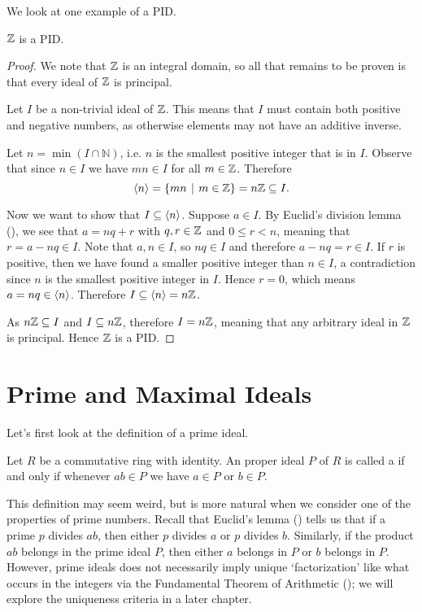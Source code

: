 We look at one example of a PID.
\begin{proposition}\label{prop-Z-is-PID}
    $\mathbb{Z}$ is a PID.
\end{proposition}
\begin{proof}
    We note that $\mathbb{Z}$ is an integral domain, so all that remains to be proven is that every ideal of $\mathbb{Z}$ is principal.

    Let $I$ be a non-trivial ideal of $\mathbb{Z}$. This means that $I$ must contain both positive and negative numbers, as otherwise elements may not have an additive inverse.

    Let $n = \min(I \cap \mathbb{N})$, i.e. $n$ is the smallest positive integer that is in $I$. Observe that since $n \in I$ we have $mn \in I$ for all $m \in \mathbb{Z}$. Therefore
    \[
        \princ{n} = \{mn \vert m \in \Z\} = n\Z \subseteq I.
    \]

    Now we want to show that $I \subseteq \left\langle n\right\rangle$. Suppose $a \in I$. By Euclid's division lemma (), we see that $a = nq + r$ with $q, r \in \mathbb{Z}$ and $0 \leq r < n$, meaning that $r = a - nq \in I$. Note that $a, n \in I$, so $nq \in I$ and therefore $a - nq = r \in I$. If $r$ is positive, then we have found a smaller positive integer than $n \in I$, a contradiction since $n$ is the smallest positive integer in $I$. Hence $r = 0$, which means $a = nq \in \left\langle n\right\rangle$. Therefore $I \subseteq \left\langle n\right\rangle = n\mathbb{Z}$.

    As $n\mathbb{Z} \subseteq I$ and $I \subseteq n\mathbb{Z}$, therefore $I = n\mathbb{Z}$, meaning that any arbitrary ideal in $\mathbb{Z}$ is principal. Hence $\mathbb{Z}$ is a PID.
\end{proof}

\section{Prime and Maximal Ideals}\label{section-prime-and-maximal-ideals}
Let's first look at the definition of a prime ideal.

\begin{definition}
    Let $R$ be a commutative ring with identity. An proper ideal $P$ of $R$ is called a  if and only if whenever $ab \in P$ we have $a \in P$ or $b \in P$.
\end{definition}

This definition may seem weird, but is more natural when we consider one of the properties of prime numbers. Recall that Euclid's lemma () tells us that if a prime $p$ divides $ab$, then either $p$ divides $a$ or $p$ divides $b$. Similarly, if the product $ab$ belongs in the prime ideal $P$, then either $a$ belongs in $P$ or $b$ belongs in $P$. However, prime ideals does not necessarily imply unique `factorization' like what occurs in the integers via the Fundamental Theorem of Arithmetic (); we will explore the uniqueness criteria in a later chapter.

